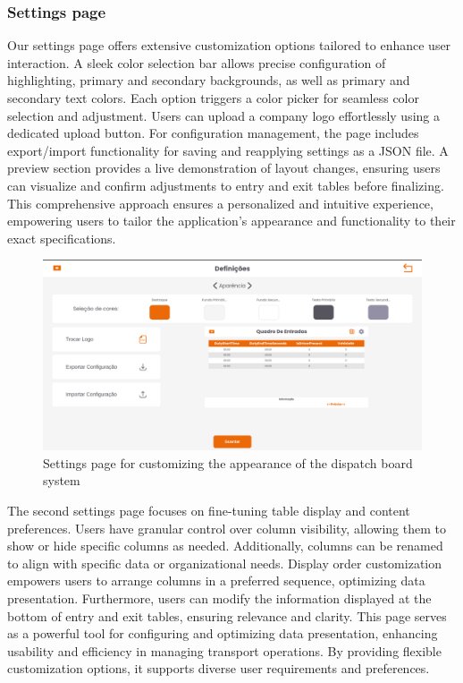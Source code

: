 \documentclass[10pt]{article}
\begin{document}
        \subsubsection{Settings page}

        Our settings page offers extensive customization options tailored to enhance user interaction. A sleek color selection bar allows precise configuration of highlighting, primary and secondary backgrounds, as well as primary and secondary text colors. Each option triggers a color picker for seamless color selection and adjustment.
        Users can upload a company logo effortlessly using a dedicated upload button. For configuration management, the page includes export/import functionality for saving and reapplying settings as a JSON file. A preview section provides a live demonstration of layout changes, ensuring users can visualize and confirm adjustments to entry and exit tables before finalizing.
        This comprehensive approach ensures a personalized and intuitive experience, empowering users to tailor the application's appearance and functionality to their exact specifications.

        \begin{figure}[h]
            \centering
            \includegraphics[width=1\textwidth]{aparencia}
            \caption{Settings page for customizing the appearance of the dispatch board system}
            \label{fig:settings_appearance}
        \end{figure}

        The second settings page focuses on fine-tuning table display and content preferences. Users have granular control over column visibility, allowing them to show or hide specific columns as needed. Additionally, columns can be renamed to align with specific data or organizational needs.
        Display order customization empowers users to arrange columns in a preferred sequence, optimizing data presentation. Furthermore, users can modify the information displayed at the bottom of entry and exit tables, ensuring relevance and clarity.
        This page serves as a powerful tool for configuring and optimizing data presentation, enhancing usability and efficiency in managing transport operations. By providing flexible customization options, it supports diverse user requirements and preferences.
\end{document}
